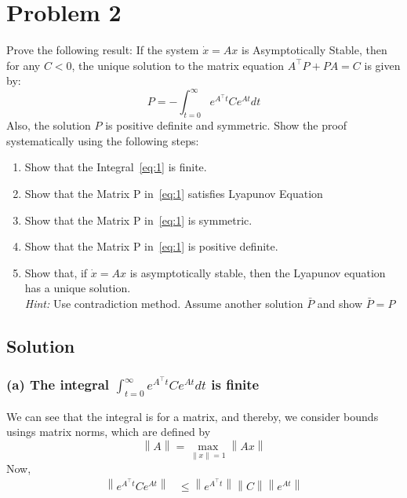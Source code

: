 \section*{Problem 2}

Prove the following result:
If the system \( \dot{x}=A x \) is Asymptotically Stable, then for any \( C<0 \), the unique solution to the matrix equation \( A^{\top} P+P A=C \) is given by:
\begin{equation*}\label{eq:1}
    P=-\int_{t=0}^{\infty} e^{A^{\top} t} C e^{A t} d t \tag{1}
\end{equation*}
Also, the solution \( P \) is positive definite and symmetric.
Show the proof systematically using the following steps:
\begin{enumerate}[label= (\alph*)]
    \item Show that the Integral~\ref{eq:1} is finite.
    \item Show that the Matrix P in~\ref{eq:1} satisfies Lyapunov Equation
    \item Show that the Matrix P in~\ref{eq:1} is symmetric.
    \item Show that the Matrix P in~\ref{eq:1} is positive definite.
    \item Show that, if \( \dot{x}=A x \) is asymptotically stable, then the Lyapunov equation has a unique solution. \\
          \textit{Hint:} Use contradiction method. Assume another solution \( \bar{P} \) and show \( \bar{P}=P \)
\end{enumerate}

\subsection*{Solution}

\subsubsection*{(a) The integral \( \displaystyle \int_{t=0}^{\infty} e^{A^{\top} t} C e^{A t} d t \) is finite}

We can see that the integral is for a matrix, and thereby, we consider bounds usings matrix norms, which are defined by
\begin{equation*}
    \left \| A \right \| = \max_{\left \| x \right \| = 1} \left \| A x \right \|
\end{equation*}
Now,
\begin{align*}
    \left \| e^{A^{\top} t} C e^{A t} \right \|
     & \leq
    \left \| e^{A^{\top} t} \right \| \left \| C \right \| \left \| e^{A t} \right \|
\end{align*}
